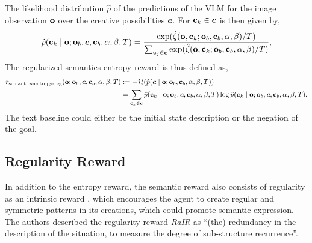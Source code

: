 The likelihood distribution \(\hat{p}\) of the predictions of the VLM for the image observation \(\mathbf{o}\) over the creative possibilities \(\bm{c}\). For \(\mathbf{c}_k \in \bm{c}\) is then given by,
\begin{equation}
    \label{eq:clip-dist-reg}
    \hat{p}(\mathbf{c}_k \mid \mathbf{o}; \mathbf{o}_b, \bm{c}, \mathbf{c}_b, \alpha, \beta, T) = \dfrac{\exp(\hat{\zeta}(\mathbf{o}, \mathbf{c}_k; \mathbf{o}_b, \mathbf{c}_b, \alpha, \beta)/T)}{\sum_{\mathbf{c}_j \in \bm{c}} \exp(\hat{\zeta}(\mathbf{o}, \mathbf{c}_k; \mathbf{o}_b, \mathbf{c}_b, \alpha, \beta)/T)},
\end{equation}
The regularized semantics-entropy reward is thus defined as,
\begin{align}
    r_{\text{semantics-entropy-reg}}(\mathbf{o}; \mathbf{o}_b, \bm{c}, \mathbf{c}_b, \alpha, \beta, T)
    &:= -\mathcal{H}(\hat{p}(\bm{c} \mid \mathbf{o}; \mathbf{o}_b, \mathbf{c}_b, \alpha, \beta, T)) \label{eq:entropy-reward-reg}\\
    &= \sum_{\mathbf{c}_k \in \bm{c}} \hat{p}(\mathbf{c}_k \mid \mathbf{o}; \mathbf{o}_b, \bm{c}, \mathbf{c}_b, \alpha, \beta, T) \log \hat{p}(\mathbf{c}_k \mid \mathbf{o}; \mathbf{o}_b, \bm{c}, \mathbf{c}_b, \alpha, \beta, T). \nonumber
\end{align}
The text baseline could either be the initial state description or the negation of the goal.
    
\subsection{Regularity Reward}
\label{sec:regularity-reward}
In addition to the entropy reward, the semantic reward also consists of regularity as an intrinsic reward \citep{rair}, which encourages the agent to create regular and symmetric patterns in its creations, which could promote semantic expression.
The authors described the regularity reward \emph{RaIR} as ``(the) redundancy in the description of the situation, to measure the degree of sub-structure recurrence''.

